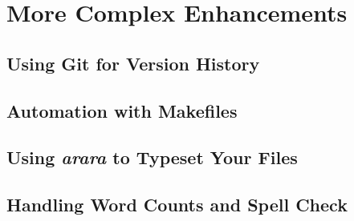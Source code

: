 %
%
%
%
%
%
%
%
%
%

\chapter{More Complex Enhancements} \label{chap:enhancements}

\section{Using Git for Version History} \label{sec:git}

\section{Automation with Makefiles} \label{sec:makefiles}

\section{Using \emph{arara} to Typeset Your Files} \label{sec:arara}

\section{Handling Word Counts and Spell Check} \label{sec:counting_spelling}

